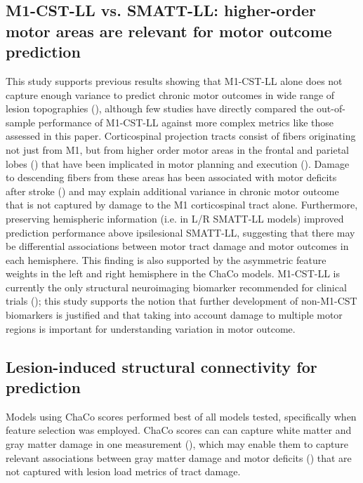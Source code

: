 \documentclass[phd,tocprelim]{cornell}
\begin{document}
\subsection{M1-CST-LL vs. SMATT-LL: higher-order motor areas are relevant for motor outcome prediction}
This study supports previous results showing that M1-CST-LL alone does not capture enough variance to predict chronic motor outcomes in wide range of lesion topographies (\cite{Rondina2017-ij, Park2016-te, Ito2022-em}), although few studies have directly compared the out-of-sample performance of M1-CST-LL against more complex metrics like those assessed in this paper. Corticospinal projection tracts consist of fibers originating not just from M1, but from higher order motor areas in the frontal and parietal lobes (\cite{Galea1994-yi}) that have been implicated in motor planning and execution (\cite{Ball1999-yo}). Damage to descending fibers from these areas has been associated with motor deficits after stroke (\cite{Ito2022-em, Riley2011-xo}) and may explain additional variance in chronic motor outcome that is not captured by damage to the M1 corticospinal tract alone. Furthermore, preserving hemispheric information (i.e. in L/R SMATT-LL models) improved prediction performance above ipsilesional SMATT-LL, suggesting that there may be differential associations between motor tract damage and motor outcomes in each hemisphere.  This finding is also supported by the asymmetric feature weights in the left and right hemisphere in the ChaCo models. M1-CST-LL is currently the only structural neuroimaging biomarker recommended for clinical trials (\cite{Boyd2017-gs}); this study supports the notion that further development of non-M1-CST biomarkers is justified and that taking into account damage to multiple motor regions is important for understanding variation in motor outcome.

\subsection{Lesion-induced structural connectivity for prediction}

Models using ChaCo scores performed best of all models tested, specifically when feature selection was employed. ChaCo scores can can capture white matter and gray matter damage in one measurement (\cite{Kuceyeski2013-nk}), which may enable them to capture relevant associations between gray matter damage and motor deficits (\cite{Park2016-te,Rondina2016-ds}) that are not captured with lesion load metrics of tract damage. 
\end{document}
